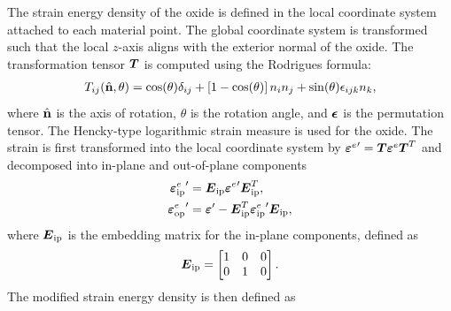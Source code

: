 The strain energy density of the oxide is defined in the local coordinate system attached to each material point. The global coordinate system is transformed such that the local $z$-axis aligns with the exterior normal of the oxide. The transformation tensor $\boldsymbol{T}$ is computed using the Rodrigues formula:
\begin{align}
  T_{ij}(\hat{\textbf{n}}, \theta) = \cos(\theta)\delta_{ij} + \left[ 1-\cos(\theta) \right] n_in_j + \sin(\theta)\epsilon_{ijk}n_k,
\end{align}
where $\hat{\textbf{n}}$ is the axis of rotation, $\theta$ is the rotation angle, and $\boldsymbol{\epsilon}$ is the permutation tensor. The Hencky-type logarithmic strain measure is used for the oxide. The strain is first transformed into the local coordinate system by ${\boldsymbol{\varepsilon}^e}' = \boldsymbol{T} {\boldsymbol{\varepsilon}^e} \boldsymbol{T}^T$ and decomposed into in-plane and out-of-plane components
\begin{subequations}
  \begin{align}
    {\boldsymbol{\varepsilon}^e_\text{ip}}' & = \boldsymbol{E}_\text{ip} {\boldsymbol{\varepsilon}^e}' \boldsymbol{E}_\text{ip}^T,                      \\
    {\boldsymbol{\varepsilon}^e_\text{op}}' & = \boldsymbol{\varepsilon}' - \boldsymbol{E}_\text{ip}^T {\boldsymbol{\varepsilon}^e_\text{ip}}' \boldsymbol{E}_\text{ip}, 
  \end{align}
\end{subequations}
where $\boldsymbol{E}_\text{ip}$ is the embedding matrix for the in-plane components, defined as
\begin{align}
  \boldsymbol{E}_\text{ip} =
  \begin{bmatrix}
    1 & 0 & 0 \\
    0 & 1 & 0 
  \end{bmatrix}.
\end{align}
The modified strain energy density is then defined as
